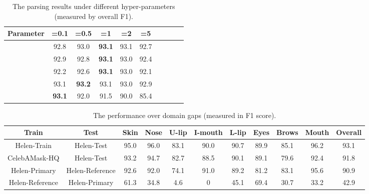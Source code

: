 \begin{table}[t]
\centering
\caption{The parsing results under different hyper-parameters (measured by overall F1).}
\label{table:hyper}
\begin{tabular}{c|cccccccc|c}
\toprule
Parameter & =0.1 & =0.5 & =1 & =2 & =5 \\ 
\midrule

 & 92.8 & 93.0 & \textbf{93.1} & 93.1 & 92.7 \\
 & 92.9 & 92.8 & \textbf{93.1} & 93.0 & 92.4 \\
 & 92.2 & 92.6 & \textbf{93.1} & 93.0 & 92.1 \\
 & 93.1 & \textbf{93.2} & 93.1 & 93.0 & 92.9 \\
 & \textbf{93.1} & 92.0 & 91.5 & 90.0 & 85.4 \\
\bottomrule
\end{tabular}
\end{table}





\begin{table*}[t]
\centering
\caption{The performance over domain gaps (measured in F1 score).}
\label{table:cross}
\begin{tabular}{c|c|cccccccc|c}
\toprule
Train & Test & Skin & Nose & U-lip & I-mouth & L-lip & Eyes & Brows & Mouth & Overall \\ 
\midrule

Helen-Train & Helen-Test & 95.0 & 96.0 & 83.1 & 90.0 & 90.7 & 89.9 & 85.1 & 96.2 & 93.1 \\
\midrule
CelebAMask-HQ & Helen-Test  & 93.2 & 94.7 & 82.7 & 88.5 & 90.1 & 89.1 & 79.6 & 92.4 & 91.8  \\
\midrule
Helen-Primary & Helen-Reference & 92.6 & 92.0 & 74.1 & 91.0 & 89.2 & 81.2 & 83.1 & 95.6 & 90.9  \\
Helen-Reference & Helen-Primary & 61.3 & 34.8 & 4.6 & 0 & 45.1 & 69.4 & 30.7 & 33.2 & 42.9  \\
\bottomrule
\end{tabular}
\end{table*}


